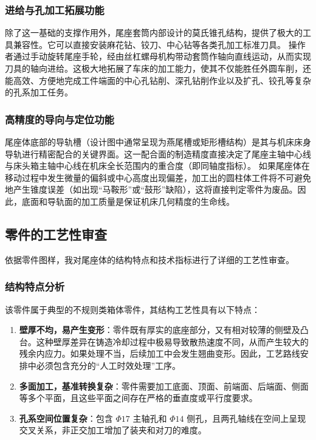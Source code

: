 \documentclass[withoutpreface,bwprint]{cumcmthesis}
\begin{document}
\subsubsection{进给与孔加工拓展功能}
除了这一基础的支撑作用外，尾座套筒内部设计的莫氏锥孔结构，提供了极大的工具兼容性。它可以直接安装麻花钻、铰刀、中心钻等各类孔加工标准刀具。
操作者通过手动旋转尾座手轮，经由丝杠螺母机构带动套筒作轴向直线运动，从而实现刀具的轴向进给。这极大地拓展了车床的加工能力，使其不仅能胜任外圆车削，还能高效、方便地完成工件端面的中心孔钻削、深孔钻削作业以及扩孔、铰孔等复杂的孔系加工任务。

\subsubsection{高精度的导向与定位功能}
尾座体底部的导轨槽（设计图中通常呈现为燕尾槽或矩形槽结构）是其与机床床身导轨进行精密配合的关键界面。这一配合面的制造精度直接决定了尾座主轴中心线与床头箱主轴中心线在机床全长范围内的重合度（即同轴度指标）。
如果尾座体在移动过程中发生微量的偏斜或中心高度出现偏差，加工出的圆柱体工件将不可避免地产生锥度误差（如出现“马鞍形”或“鼓形”缺陷），这将直接判定零件为废品。因此，底面和导轨面的加工质量是保证机床几何精度的生命线。

\subsection{零件的工艺性审查}
依据零件图样，我对尾座体的结构特点和技术指标进行了详细的工艺性审查。

\subsubsection{结构特点分析}
该零件属于典型的不规则类箱体零件，其结构工艺性具有以下特点：
\begin{enumerate}
    \item \textbf{壁厚不均，易产生变形}：零件既有厚实的底座部分，又有相对较薄的侧壁及凸台。这种壁厚差异在铸造冷却过程中极易导致散热速度不同，从而产生较大的残余内应力。如果处理不当，后续加工中会发生翘曲变形。因此，工艺路线安排中必须包含充分的“人工时效处理”工序。
    \item \textbf{多面加工，基准转换复杂}：零件需要加工底面、顶面、前端面、后端面、侧面等多个平面，且这些平面之间存在严格的垂直度或平行度要求。
    \item \textbf{孔系空间位置复杂}：包含 $\Phi17$ 主轴孔和 $\Phi14$ 侧孔，且两孔轴线在空间上呈现交叉关系，非正交加工增加了装夹和对刀的难度。
\end{enumerate}
\end{document}
